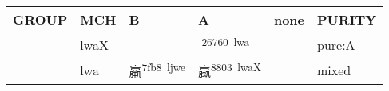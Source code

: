 \documentclass[14pt,a4paper]{scrartcl}
\begin{document}
\begin{longtable}[c]{@{}llllll@{}}
\toprule
\begin{minipage}[b]{0.14\columnwidth}\raggedright\strut
GROUP
\strut\end{minipage} &
\begin{minipage}[b]{0.14\columnwidth}\raggedright\strut
MCH
\strut\end{minipage} &
\begin{minipage}[b]{0.14\columnwidth}\raggedright\strut
B
\strut\end{minipage} &
\begin{minipage}[b]{0.14\columnwidth}\raggedright\strut
A
\strut\end{minipage} &
\begin{minipage}[b]{0.14\columnwidth}\raggedright\strut
none
\strut\end{minipage} &
\begin{minipage}[b]{0.14\columnwidth}\raggedright\strut
PURITY
\strut\end{minipage}\tabularnewline
\midrule
\endhead
\begin{minipage}[t]{0.14\columnwidth}\raggedright\strut
𦟀
\strut\end{minipage} &
\begin{minipage}[t]{0.14\columnwidth}\raggedright\strut
lwaX
\strut\end{minipage} &
\begin{minipage}[t]{0.14\columnwidth}\raggedright\strut
\strut\end{minipage} &
\begin{minipage}[t]{0.14\columnwidth}\raggedright\strut
𦝠\textsuperscript{26760~lwa}
\strut\end{minipage} &
\begin{minipage}[t]{0.14\columnwidth}\raggedright\strut
\strut\end{minipage} &
\begin{minipage}[t]{0.14\columnwidth}\raggedright\strut
pure:A
\strut\end{minipage}\tabularnewline
\begin{minipage}[t]{0.14\columnwidth}\raggedright\strut
𣎆
\strut\end{minipage} &
\begin{minipage}[t]{0.14\columnwidth}\raggedright\strut
lwa
\strut\end{minipage} &
\begin{minipage}[t]{0.14\columnwidth}\raggedright\strut
羸\textsuperscript{7fb8~ljwe}
\strut\end{minipage} &
\begin{minipage}[t]{0.14\columnwidth}\raggedright\strut
蠃\textsuperscript{8803~lwaX}
\strut\end{minipage} &
\begin{minipage}[t]{0.14\columnwidth}\raggedright\strut
\strut\end{minipage} &
\begin{minipage}[t]{0.14\columnwidth}\raggedright\strut
mixed
\strut\end{minipage}\tabularnewline
\bottomrule
\end{longtable}
\end{document}
